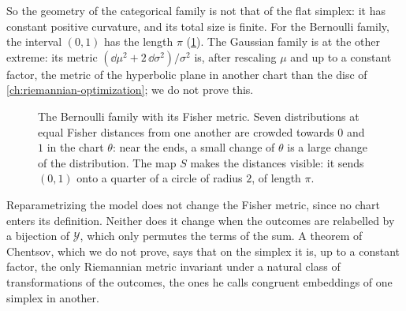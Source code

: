 \begin{notechapter}
So the geometry of the categorical family is not that of the flat
simplex: it has constant positive curvature, and its total size is
finite. For the Bernoulli family, the interval $(0, 1)$ has the length
$\pi$ (\cref{natural-gradient:fig:arc}). The Gaussian family is at the
other extreme: its metric $(\dd\mu^2 + 2\,\dd\sigma^2)/\sigma^2$ is,
after rescaling $\mu$ and up to a constant factor, the metric of the
hyperbolic plane in another chart than the disc of
\cref{ch:riemannian-optimization}; we do not prove this.

\begin{figure}[ht]
\centering
{}
\caption{The Bernoulli family with its Fisher metric. Seven distributions
at equal Fisher distances from one another are crowded towards $0$ and
$1$ in the chart $\theta$: near the ends, a small change of $\theta$ is a
large change of the distribution. The map $S$ makes the distances
visible: it sends $(0, 1)$ onto a quarter of a circle of radius $2$, of
length $\pi$.}
\label{natural-gradient:fig:arc}
\end{figure}

\begin{remark}\label{natural-gradient:rem:invariance}
Reparametrizing the model does not change the Fisher metric, since no
chart enters its definition. Neither does it change when the outcomes
are relabelled by a bijection of $\mathcal Y$, which only permutes the
terms of the sum. A theorem of Chentsov, which we do not prove, says that
on the simplex it is, up to a constant factor, the only Riemannian metric
invariant under a natural class of transformations of the outcomes, the
ones he calls congruent embeddings of one simplex in another.
\end{remark}


\end{notechapter}
